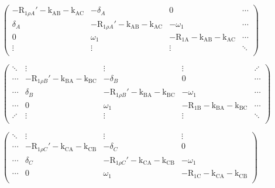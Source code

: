 \documentclass[a4paper,11pt,twoside,openright]{book}
\def\lthtmlcheckvsize{\ifdim\ht\sizebox<\vsize 
  \ifdim\wd\sizebox<\hsize\expandafter\hfill\fi \expandafter\vfill
  \else\expandafter\vss\fi}%
\begin{document}
{\newpage\clearpage
{}%
$\displaystyle \begin{pmatrix}
-\mathrm{R}_{1\rho A}'-\textrm{k}_{\textrm{AB}}-\textrm{k}_{\textrm{AC}}& -\delta_A                 & 0                 & \cdots \\
\delta_A                  & -\mathrm{R}_{1\rho A}'-\textrm{k}_{\textrm{AB}}-\textrm{k}_{\textrm{AC}}& -\omega_1 & \cdots \\
0                         & \omega_1 & -\mathrm{R}_{\textrm{1A}}-\textrm{k}_{\textrm{AB}}-\textrm{k}_{\textrm{AC}}& \cdots \\
\vdots                    & \vdots                    & \vdots            & \ddots \\
\end{pmatrix}$%
\lthtmlindisplaymathZ
\lthtmlcheckvsize\clearpage}

{\newpage\clearpage
{}%
$\displaystyle \begin{pmatrix}
\ddots  & \vdots                    & \vdots                    & \vdots            & \iddots \\
\cdots  & -\mathrm{R}_{1\rho B}'-\textrm{k}_{\textrm{BA}}-\textrm{k}_{\textrm{BC}}& -\delta_B                 & 0                 & \cdots \\
\cdots  & \delta_B                  & -\mathrm{R}_{1\rho B}'-\textrm{k}_{\textrm{BA}}-\textrm{k}_{\textrm{BC}}& -\omega_1 & \cdots \\
\cdots  & 0                         & \omega_1 & -\mathrm{R}_{\textrm{1B}}-\textrm{k}_{\textrm{BA}}-\textrm{k}_{\textrm{BC}}& \cdots \\
\iddots & \vdots                    & \vdots                    & \vdots            & \ddots \\
\end{pmatrix}$%
\lthtmlindisplaymathZ
\lthtmlcheckvsize\clearpage}

{\newpage\clearpage
{}%
$\displaystyle \begin{pmatrix}
\ddots & \vdots                    & \vdots                    & \vdots \\
\cdots & -\mathrm{R}_{1\rho C}'-\textrm{k}_{\textrm{CA}}-\textrm{k}_{\textrm{CB}}& -\delta_C                 & 0 \\
\cdots & \delta_C                  & -\mathrm{R}_{1\rho C}'-\textrm{k}_{\textrm{CA}}-\textrm{k}_{\textrm{CB}}& -\omega_1 \\
\cdots & 0                         & \omega_1 & -\mathrm{R}_{\textrm{1C}}-\textrm{k}_{\textrm{CA}}-\textrm{k}_{\textrm{CB}}\\
\end{pmatrix}$%
\lthtmlindisplaymathZ
\lthtmlcheckvsize\clearpage}
\end{document}

